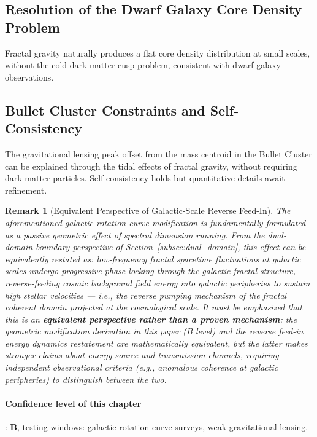 \documentclass[12pt,a4paper,twocolumn]{article}
\newtheorem{remark}[theorem]{Remark}
\begin{document}
\subsection{Resolution of the Dwarf Galaxy Core Density Problem}
Fractal gravity naturally produces a flat core density distribution at small scales, without the cold dark matter cusp problem, consistent with dwarf galaxy observations.

\subsection{Bullet Cluster Constraints and Self-Consistency}
The gravitational lensing peak offset from the mass centroid in the Bullet Cluster can be explained through the tidal effects of fractal gravity, without requiring dark matter particles. Self-consistency holds but quantitative details await refinement.

\begin{remark}[Equivalent Perspective of Galactic-Scale Reverse Feed-In]
\label{rmk:dark_matter_reverse_feed}
The aforementioned galactic rotation curve modification is fundamentally formulated as a passive geometric effect of spectral dimension running. From the dual-domain boundary perspective of Section~\ref{subsec:dual_domain}, this effect can be \emph{equivalently restated} as: low-frequency fractal spacetime fluctuations at galactic scales undergo progressive phase-locking through the galactic fractal structure, reverse-feeding cosmic background field energy into galactic peripheries to sustain high stellar velocities --- i.e., the reverse pumping mechanism of the fractal coherent domain projected at the cosmological scale. It must be emphasized that this is an \textbf{equivalent perspective rather than a proven mechanism}: the geometric modification derivation in this paper (B level) and the reverse feed-in energy dynamics restatement are mathematically equivalent, but the latter makes stronger claims about energy source and transmission channels, requiring independent observational criteria (e.g., anomalous coherence at galactic peripheries) to distinguish between the two.
\end{remark}

\paragraph{Confidence level of this chapter}: \textbf{B}, testing windows: galactic rotation curve surveys, weak gravitational lensing.
\end{document}
